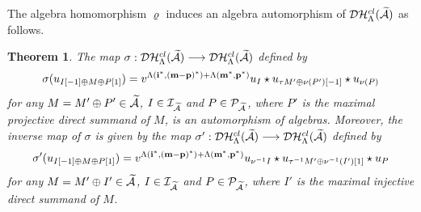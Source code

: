 \documentclass[reqno,12pt]{amsart}
\numberwithin{equation}{section}
\def\P{\mathcal{P}}\def\I{\mathcal{I}}\def\X{\mathbb X}\def\T{\mathbb T}\def\e{\mbox{\rm e}}
\theoremstyle{plain} %
\newtheorem{theorem}{\bf Theorem}[section]
\theoremstyle{definition} %
\begin{document}
The algebra homomorphism $\varrho$ induces an algebra automorphism of $\mathcal {D}\mathcal {H}_\Lambda^{{cl}}(\widetilde{\mathcal{A}})$ as follows.
\begin{theorem}\label{zmainthm}
The map $\sigma:\mathcal {D}\mathcal {H}_\Lambda^{{cl}}(\widetilde{\mathcal{A}})\longrightarrow\mathcal {D}\mathcal {H}_\Lambda^{{cl}}(\widetilde{\mathcal{A}})$ defined by
$$\sigma(u_{I[-1]\oplus M\oplus P[1]})=v^{\Lambda({\bf i}^\ast,({\bf m}-{\bf p})^\ast)+\Lambda({\bf m}^\ast,{\bf p}^\ast)}u_I\star u_{\tau M'\oplus \nu(P')[-1]}\star u_{\nu(P)}$$ for any $M=M'\oplus P'\in\widetilde{\mathcal{A}}$, $I\in\I_{\widetilde{\A}}$ and $P\in\P_{\widetilde{\A}}$, where $P'$ is the maximal projective direct summand of $M$, is an automorphism of algebras. Moreover, the inverse map of $\sigma$ is given by the map $\sigma':\mathcal {D}\mathcal {H}_\Lambda^{{cl}}(\widetilde{\mathcal{A}})\longrightarrow\mathcal {D}\mathcal {H}_\Lambda^{{cl}}(\widetilde{\mathcal{A}})$ defined by
$$\sigma'(u_{I[-1]\oplus M\oplus P[1]})=v^{\Lambda({\bf i}^\ast,({\bf m}-{\bf p})^\ast)+\Lambda({\bf m}^\ast,{\bf p}^\ast)}u_{\nu^{-1}I}\star u_{\tau^{-1} M'\oplus \nu^{-1}(I')[1]}\star u_{P}$$ for any $M=M'\oplus I'\in\widetilde{\mathcal{A}}$, $I\in\I_{\widetilde{\A}}$ and $P\in\P_{\widetilde{\A}}$, where $I'$ is the maximal injective direct summand of $M$.
\end{theorem}
\end{document}
